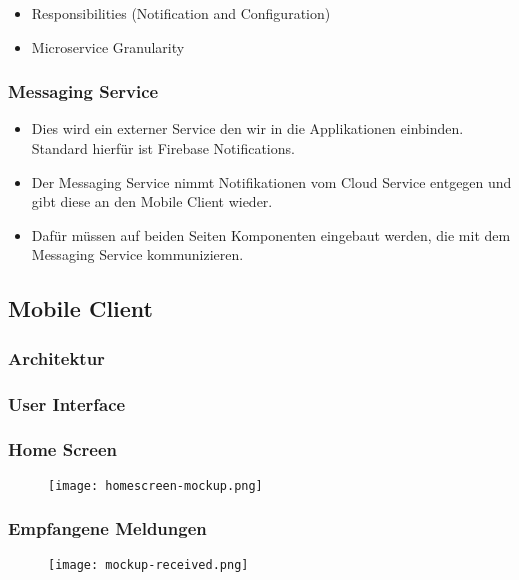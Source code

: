         \begin{itemize}
            \item Responsibilities (Notification and Configuration)
            \item Microservice Granularity
        \end{itemize}


    \subsubsection*{Messaging Service}

        \begin{itemize}
            \item Dies wird ein externer Service den wir in die Applikationen einbinden. Standard hierfür ist Firebase Notifications. 
            \item Der Messaging Service nimmt Notifikationen vom Cloud Service entgegen und gibt diese an den Mobile Client wieder. 
            \item Dafür müssen auf beiden Seiten Komponenten eingebaut werden, die mit dem Messaging Service kommunizieren.
        \end{itemize}

\clearpage
\subsection{Mobile Client}
    \subsubsection{Architektur}
    \subsubsection{User Interface}
        \subsubsection*{Home Screen}
            \begin{figure}[H]
            \centering
            \texttt{[image: homescreen-mockup.png]}
            \end{figure}
        \subsubsection*{Empfangene Meldungen}
            \begin{figure}[H]
            \centering
            \texttt{[image: mockup-received.png]}
            \end{figure}



